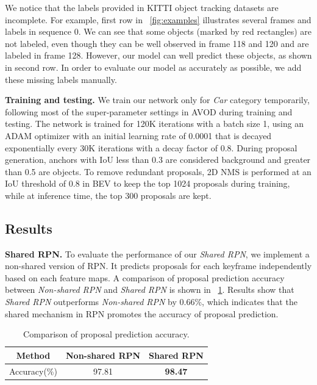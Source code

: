 \documentclass[letterpaper, 10pt, conference]{ieeeconf}  %
\begin{document}
We notice that the labels provided in KITTI object tracking datasets are incomplete. For example, first row in \figurename \, \ref{fig:examples} illustrates several frames and labels in sequence 0. We can see that some objects (marked by red rectangles) are not labeled, even though they can be well observed in frame 118 and 120 and are labeled in frame 128. However, our model can well predict these objects, as shown in second row. In order to evaluate our model as accurately as possible, we add these missing labels manually.

\textbf{Training and testing.} We train our network only for \textit{Car} category temporarily, following most of the super-parameter settings in AVOD \cite{ku2018joint} during training and testing. The network is trained for 120K iterations with a batch size 1, using an ADAM \cite{kingma2014adam} optimizer with an initial learning rate of 0.0001 that is decayed exponentially every 30K iterations with a decay factor of 0.8. During proposal generation, anchors with IoU less than 0.3 are considered background and greater than 0.5 are objects. To remove redundant proposals, 2D NMS is performed at an IoU threshold of 0.8 in BEV to keep the top 1024 proposals during training, while at inference time, the top 300 proposals are kept. 

\subsection{Results}
\textbf{Shared RPN.} To evaluate the performance of our \textit{Shared RPN}, we implement a non-shared version of RPN. It predicts proposals for each keyframe independently based on each feature maps. A comparison of proposal prediction accuracy between \textit{Non-shared RPN} and \textit{Shared RPN} is shown in \tablename \, \ref{table:rpn_result}. Results show that \textit{Shared RPN} outperforms \textit{Non-shared RPN} by 0.66\%, which indicates that the shared mechanism in RPN promotes the accuracy of proposal prediction. 
\begin{table}[h]\centering
	\vspace{-0.2cm}
		\begin{tabular}{ccc}
			\toprule[1pt]
			Method        & Non-shared RPN & Shared RPN  \\ \midrule
			Accuracy(\%)  & 97.81      & \textbf{98.47}       \\
			\bottomrule[1pt]
	\end{tabular}
	\caption{Comparison of proposal prediction accuracy.}
	\label{table:rpn_result}
	\vspace{-0.3cm}
\end{table}
\end{document}
